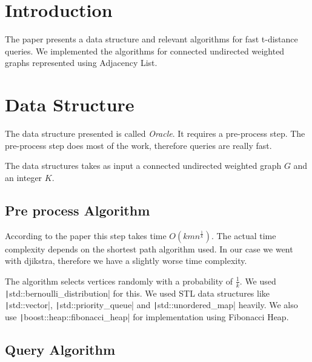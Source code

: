 \documentclass[12pt, a4paper]{article}
\newcommand{\code}[1]{\texttt|#1|}
\begin{document}
    \begin{minipage}[]{\textwidth}
    \end{minipage}

    \section{Introduction}
    
    The paper\cite{paper} presents a data structure and relevant algorithms for fast t-distance queries. We implemented the algorithms for connected undirected weighted graphs represented using Adjacency List.

    \section{Data Structure}

    The data structure presented is called \emph{Oracle}. It requires a pre-process step. The pre-process step does most of the work, therefore queries are really fast.

    The data structures takes as input a connected undirected weighted graph $G$ and an integer $K$.

    \subsection{Pre process Algorithm}

    According to the paper this step takes time $O(kmn^{\frac{1}{k}})$. The actual time complexity depends on the shortest path algorithm used. In our case we went with djikstra, therefore we have a slightly worse time complexity.

    The algorithm selects vertices randomly with a probability of $\frac{1}{k}$. We used \code{std::bernoulli_distribution} for this. We used STL data structures like \code{std::vector}, \code{std::priority_queue} and \code{std::unordered_map} heavily. We also use \code{boost::heap::fibonacci_heap} for implementation using Fibonacci Heap.

    \subsection{Query Algorithm}
\end{document}

